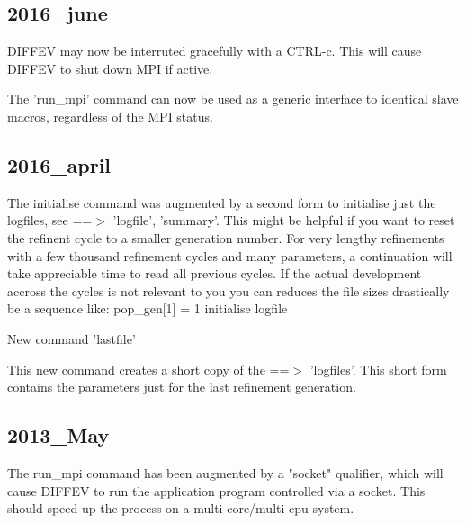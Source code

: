 \subsection*{2016\_june}
\par
DIFFEV may now be interruted gracefully with a CTRL-c. 
This will cause DIFFEV to shut down MPI if active. 
\par
The 'run\_mpi' command can now be used as a generic interface to identical 
slave macros, regardless of the MPI status. 
\subsection*{2016\_april}
\par
The initialise command was augmented by a second form to  initialise 
just the logfiles, see ==$> $ 'logfile', 'summary'. 
This might be helpful if you want to reset the refinent cycle 
to a smaller generation number. For very lengthy refinements with 
a few thousand refinement cycles and many parameters, a continuation 
will take appreciable time to read all previous cycles. If the 
actual development accross the cycles is not relevant to you you 
can reduces the file sizes drastically be a sequence like: 
pop\_gen[1] = 1 
initialise logfile 
\par
New command 'lastfile' 
\par
This new command creates a short copy of the ==$> $ 'logfiles'. 
This short form contains the parameters just for the last 
refinement generation. 
\subsection*{2013\_May}
\par
The run\_mpi command has been augmented by a "socket" qualifier, which 
will cause DIFFEV to run the application program controlled via a 
socket. This should speed up the process on a multi-core/multi-cpu 
system. 

